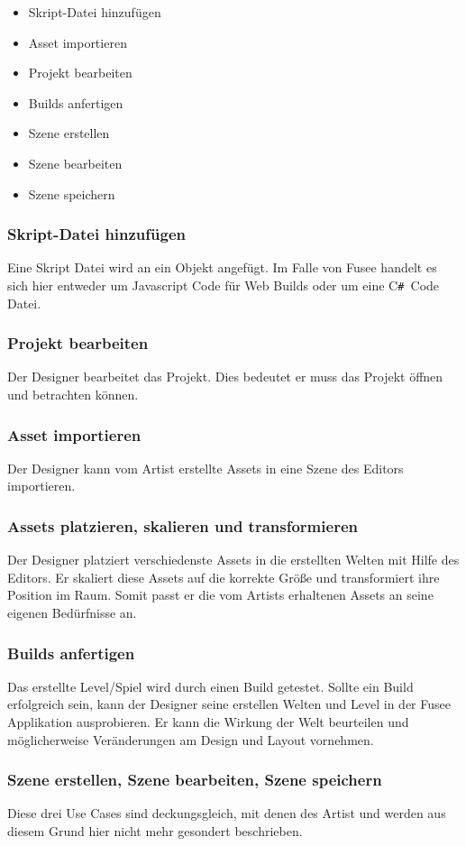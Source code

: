 \documentclass[pagesize, paper=a4, fontsize=12pt, titlepage=true, headings=small, headnosepline, abstractoff, liststotoc, nochapterprefix, plainheadsepline, twoside]{scrreprt}
\newcommand{\CSS}{C\texttt{\# }}
\begin{document}
\begin{itemize}
\item Skript-Datei hinzufügen
\item Asset importieren
\item Projekt bearbeiten
\item Builds anfertigen
\item Szene erstellen
\item Szene bearbeiten
\item Szene speichern
\end{itemize}

\subsubsection{Skript-Datei hinzufügen}
Eine Skript Datei wird an ein Objekt angefügt. Im Falle von Fusee handelt es sich hier entweder um Javascript Code für Web Builds oder um eine \CSS Code Datei.
\subsubsection{Projekt bearbeiten}
Der Designer bearbeitet das Projekt. Dies bedeutet er muss das Projekt öffnen und betrachten können.
\subsubsection{Asset importieren}
Der Designer kann vom Artist erstellte Assets in eine Szene des Editors importieren. 
\subsubsection{Assets platzieren, skalieren und transformieren}
Der Designer platziert verschiedenste Assets in die erstellten Welten mit Hilfe des Editors. Er skaliert diese Assets auf die korrekte Größe und transformiert ihre Position im Raum. Somit passt er die vom Artists erhaltenen Assets an seine eigenen Bedürfnisse an. 
\subsubsection{Builds anfertigen}
Das erstellte Level/Spiel wird durch einen Build getestet. Sollte ein Build erfolgreich sein, kann der Designer seine erstellen Welten und Level in der Fusee Applikation ausprobieren. Er kann die Wirkung der Welt beurteilen und möglicherweise Veränderungen am Design und Layout vornehmen.
\subsubsection{Szene erstellen, Szene bearbeiten, Szene speichern}
Diese drei Use Cases sind deckungsgleich, mit denen des Artist und werden aus diesem Grund hier nicht mehr gesondert beschrieben.
\end{document}
